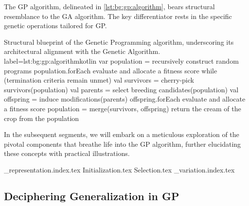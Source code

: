   The GP algorithm, delineated in \vref{lst:bg:gp:algorithm}, bears structural 
  resemblance to the GA algorithm. The key differentiator rests in the specific 
  genetic operations tailored for GP.

  \begin{code}{
    Structural blueprint of the Genetic Programming algorithm, underscoring its 
    architectural alignment with the Genetic Algorithm.
  }{label=lst:bg:gp:algorithm}{kotlin}
    var population = recursively construct random programs
    population.forEach { evaluate and allocate a fitness score }
    while (termination criteria remain unmet) {
      val survivors = cherry-pick survivors(population)
      val parents = select breeding candidates(population)
      val offspring = induce modifications(parents)
      offspring.forEach { evaluate and allocate a fitness score }
      population = merge(survivors, offspring)
    }
    return the cream of the crop from the population
  \end{code}

  In the subsequent segments, we will embark on a meticulous exploration of the 
  pivotal components that breathe life into the GP algorithm, further elucidating 
these concepts with practical illustrations.

{_representation.index.tex}
{Initialization.tex}
{Selection.tex}
{_variation.index.tex}

\subsection{Deciphering Generalization in GP}
